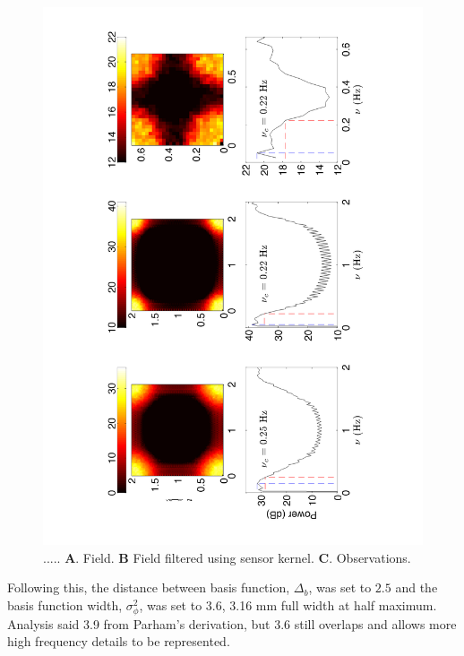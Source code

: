 \documentclass[12pt]{iopart}
\begin{document}
\begin{figure}
	\begin{center}
		\includegraphics[scale=0.5, angle=-90]{./Graph/FreqAnalysis.pdf}
	\end{center}
	\caption{..... \textbf{A}. Field. \textbf{B} Field filtered using sensor kernel. \textbf{C}. Observations.} \label{fig:FreqAnalysis} 
\end{figure}
Following this, the distance between basis function, $\Delta_b$, was set to $2.5$ and the basis function width, $\sigma_{\phi}^2$, was set to 3.6, 3.16 mm full width at half maximum. Analysis said 3.9 from Parham's derivation, but 3.6 still overlaps and allows more high frequency details to be represented.
\end{document}
